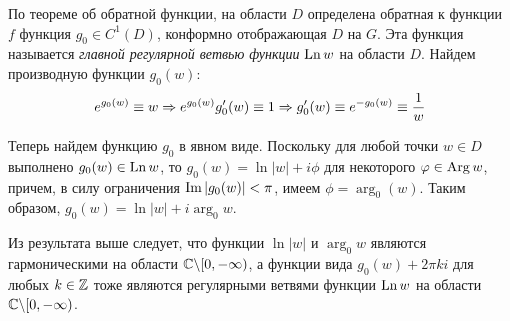 \begin{example}
\begin{center}
	\end{center}
	
	По теореме об обратной функции, на области $D$ определена обратная к функции $f$ функция $g_0 \in C^1(D)$, конформно отображающая $D$ на $G$. Эта функция называется \textit{главной регулярной ветвью функции} $\operatorname{Ln}{w}$ на области $D$. Найдем производную функции $g_0(w)$:
	\[e^{g_0(w)} \equiv w \Rightarrow e^{g_0(w)}g_0'(w) \equiv 1 \Rightarrow g_0'(w) \equiv e^{-g_0(w)} \equiv \frac{1}{w}\]
	
	Теперь найдем функцию $g_0$ в явном виде. Поскольку для любой точки $w \in D$ выполнено $g_0(w) \in \operatorname{Ln}{w}$, то $g_0(w) = \ln|w| + i\phi$ для некоторого $\varphi \in \operatorname{Arg}{w}$, причем, в силу ограничения $\operatorname{Im}|g_0(w)| < \pi$, имеем $\phi = \arg_0(w)$. Таким образом, $g_0(w) = \ln|w| + i\arg_0{w}$.
\end{example}

\begin{note}
	Из результата выше следует, что функции $\ln|w|$ и $\arg_0w$ являются гармоническими на области $\mathbb{C} \backslash [0, -\infty)$, а функции вида $g_0(w) + 2\pi k i$ для любых $k \in \mathbb{Z}$ тоже являются регулярными ветвями функции $\operatorname{Ln}{w}$ на области $\mathbb{C} \backslash [0, -\infty)$.
\end{note}

